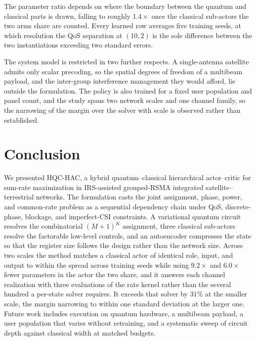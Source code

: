 \documentclass[12pt,onecolumn]{IEEEtran}
\newif\iffull
\newcommand{\fullonly}[1]{\iffull #1\fi}
\begin{document}
The parameter ratio depends on where the boundary between the quantum and
classical parts is drawn, falling to roughly $1.4\times$ once the classical
sub-actors the two arms share are counted. Every learned row averages
five training seeds, at which resolution the QoS separation at $(10,2)$ is the
sole difference between the two instantiations exceeding two standard errors.

The system model is restricted in two further respects. A single-antenna
satellite admits only scalar precoding, so the spatial degrees of freedom of a
multibeam payload, and the inter-group interference management they would afford,
lie outside the formulation. The policy is also trained for a fixed user
population and panel count, and the study spans two network scales and one
channel family, so the narrowing of the margin over the solver with scale is
observed rather than established.

\section{Conclusion}
\label{sec:conclusion}

We presented HQC-HAC, a hybrid quantum--classical hierarchical actor--critic for sum-rate
maximization in IRS-assisted grouped-RSMA integrated satellite--terrestrial networks. The
formulation casts the joint assignment, phase, power, and common-rate problem as a sequential
dependency chain under QoS, discrete-phase, blockage, and imperfect-CSI constraints. A
variational quantum circuit resolves the combinatorial $(M{+}1)^K$ assignment, three
classical sub-actors resolve the factorable low-level controls, and an autoencoder compresses
the state so that the register size follows the design rather than the network size. Across
two scales the method matches a classical actor of identical role, input, and output to
within the spread across training seeds while using $9.2\times$ and $6.0\times$ fewer
parameters in the actor the two share, and it answers each channel realization with three
evaluations of the rate kernel rather than the several hundred a per-state solver requires.
It exceeds that solver by $31\%$ at the smaller scale, the margin narrowing to within one
standard deviation at the larger one.
\fullonly{The ablations attribute the outcome to the compression rather than to the
register size, the observable set, or the entangling structure, none of which alters
performance measurably at these scales. }Future work includes execution on quantum hardware, a multibeam payload, a
user population that varies without retraining, and a systematic sweep of circuit depth
against classical width at matched budgets.
\end{document}
